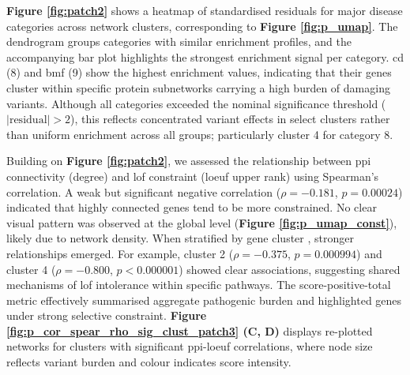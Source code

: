 \textbf{Figure \ref{fig:patch2}} shows a heatmap of standardised residuals for major disease categories across network clusters, corresponding to \textbf{Figure \ref{fig:p_umap}}. 
The dendrogram groups categories with similar enrichment profiles, and the accompanying bar plot highlights the strongest enrichment signal per category. 
\ac{cd} (8) and \ac{bmf} (9) show the highest enrichment values, indicating that their genes cluster within specific protein subnetworks carrying a high burden of damaging variants. 
Although all categories exceeded the nominal significance threshold (\(|\mathrm{residual}| > 2\)), this reflects concentrated variant effects in select clusters rather than uniform enrichment across all groups; particularly cluster 4 for category 8.

Building on \textbf{Figure \ref{fig:patch2}}, we assessed the relationship between \ac{ppi} connectivity (degree) and \ac{lof} constraint (\ac{loeuf} upper rank) \cite{karczewski2020mutational} using Spearman’s correlation. 
A weak but significant negative correlation ($\rho=-0.181$, $p=0.00024$) indicated that highly connected genes tend to be more constrained. 
No clear visual pattern was observed at the global level (\textbf{Figure \ref{fig:p_umap_const}}), likely due to network density. 
When stratified by gene cluster \cite{szklarczyk2025string}, stronger relationships emerged. For example, cluster 2 ($\rho=-0.375$, $p=0.000994$) and cluster 4 ($\rho=-0.800$, $p<0.000001$) showed clear associations, suggesting shared mechanisms of \ac{lof} intolerance within specific pathways.
The score-positive-total metric effectively summarised aggregate pathogenic burden and highlighted genes under strong selective constraint.  
\textbf{Figure \ref{fig:p_cor_spear_rho_sig_clust_patch3} (C, D)} displays re-plotted networks for clusters with significant \ac{ppi}-\ac{loeuf} correlations, where node size reflects variant burden and colour indicates score intensity.

